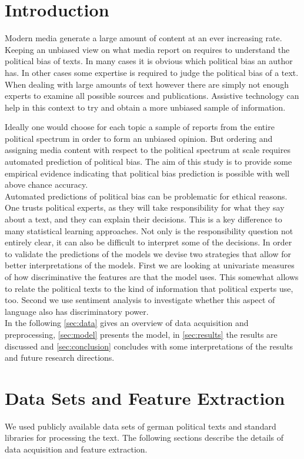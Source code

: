 \documentclass[runningheads,a4paper]{llncs}
\begin{document}
\section{Introduction}
\label{sec:intro}
%
Modern media generate a large amount of content at an ever increasing rate. Keeping an unbiased view on what media report on requires to understand the political bias of texts. In many cases it is obvious which political bias an author has. In other cases some expertise is required to judge the political bias of a text. 
%
When dealing with large amounts of text however there are simply not enough experts to examine all possible sources and publications. Assistive technology can help in this context to try and obtain a more unbiased sample of information. 

Ideally one would choose for each topic a sample of reports from the entire political spectrum in order to form an unbiased opinion. But ordering and assigning media content with respect to the political spectrum at scale requires automated prediction of political bias. The aim of this study is to provide some empirical evidence indicating that political bias prediction is possible with well above chance accuracy. \\


Automated predictions of political bias can be problematic for ethical reasons. One trusts political experts, as they will take responsibility for what they say about a text, and they can explain their decisions. This is a key difference to many statistical learning approaches. Not only is the responsibility question not entirely clear, it can also be difficult to interpret some of the decisions. In order to validate the predictions of the models we devise two strategies that allow for better interpretations of the models. First we are looking at univariate measures of how discriminative the features are that the model uses. This somewhat allows to relate the political texts to the kind of information that political experts use, too. Second we use sentiment analysis to investigate whether this aspect of language also has discriminatory power. \\


In the following \autoref{sec:data} gives an overview of data acquisition and preprocessing, \autoref{sec:model} presents the model, in \autoref{sec:results} the results are discussed and \autoref{sec:conclusion} concludes with some interpretations of the results and future research directions. 

\section{Data Sets and Feature Extraction}\label{sec:data}
%
We used publicly available data sets of german political texts and standard libraries for processing the text. The following sections describe the details of data acquisition and feature extraction. 
\end{document}
